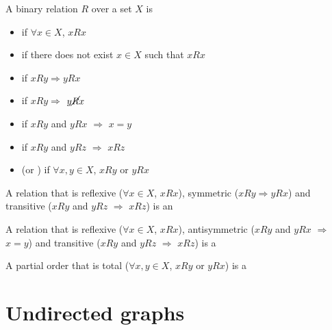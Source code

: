 \documentclass[aspectratio=169]{beamer}\usepackage[]{graphicx}\usepackage[]{xcolor}
\begin{document}
\begin{frame}
	\begin{definition}
		A binary relation $R$ over a set $X$ is
	\begin{itemize}
	\item {} if $\forall x\in X$, $xRx$
	\item {} if there does not exist $x\in X$ such that $xRx$
	\item {} if $xRy \Rightarrow yRx$
	\item {} if $xRy \Rightarrow $ $y\cancel R x$
	\item {} if $xRy$ and $yRx$ $\Rightarrow$ $x=y$
	\item {} if $xRy$ and $yRz$ $\Rightarrow$  $xRz$
	\item {} (or ) if $\forall x, y\in X$, $x R y$ or $y R x$
	\end{itemize}
	\end{definition}
\end{frame}
	
	
\begin{frame} 
	\begin{definition}
	 A relation that is reflexive ($\forall x\in X$, $xRx$), symmetric ($xRy \Rightarrow yRx$) and transitive ($xRy$ and $yRz$ $\Rightarrow$  $xRz$) is an 
	\end{definition}
	\vfill
	\begin{definition}
	 A relation that is reflexive ($\forall x\in X$, $xRx$), antisymmetric ($xRy$ and $yRx$ $\Rightarrow$ $x=y$) and transitive ($xRy$ and $yRz$ $\Rightarrow$  $xRz$) is a 
	\end{definition}
	\vfill
	\begin{definition}
	A partial order that is total ($\forall x, y\in X$, $x R y$ or $y R x$) is a 
	\end{definition}
\end{frame}
	



\section{Undirected graphs}
\end{document}
